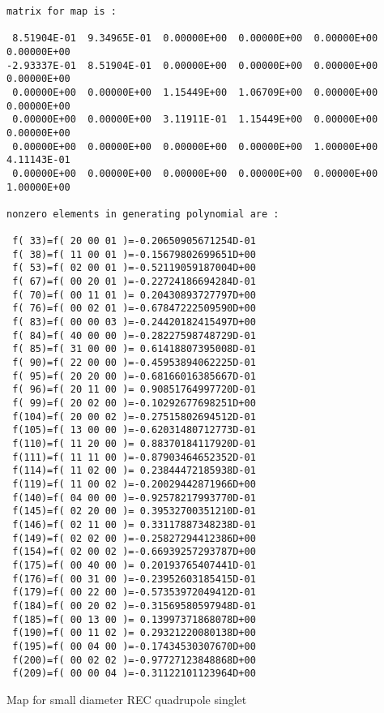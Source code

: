 \begin{footnotesize}
\begin{verbatim}
matrix for map is :

 8.51904E-01  9.34965E-01  0.00000E+00  0.00000E+00  0.00000E+00  0.00000E+00
-2.93337E-01  8.51904E-01  0.00000E+00  0.00000E+00  0.00000E+00  0.00000E+00
 0.00000E+00  0.00000E+00  1.15449E+00  1.06709E+00  0.00000E+00  0.00000E+00
 0.00000E+00  0.00000E+00  3.11911E-01  1.15449E+00  0.00000E+00  0.00000E+00
 0.00000E+00  0.00000E+00  0.00000E+00  0.00000E+00  1.00000E+00  4.11143E-01
 0.00000E+00  0.00000E+00  0.00000E+00  0.00000E+00  0.00000E+00  1.00000E+00

nonzero elements in generating polynomial are :

 f( 33)=f( 20 00 01 )=-0.20650905671254D-01
 f( 38)=f( 11 00 01 )=-0.15679802699651D+00
 f( 53)=f( 02 00 01 )=-0.52119059187004D+00
 f( 67)=f( 00 20 01 )=-0.22724186694284D-01
 f( 70)=f( 00 11 01 )= 0.20430893727797D+00
 f( 76)=f( 00 02 01 )=-0.67847222509590D+00
 f( 83)=f( 00 00 03 )=-0.24420182415497D+00
 f( 84)=f( 40 00 00 )=-0.28227598748729D-01
 f( 85)=f( 31 00 00 )= 0.61418807395008D-01
 f( 90)=f( 22 00 00 )=-0.45953894062225D-01
 f( 95)=f( 20 20 00 )=-0.68166016385667D-01
 f( 96)=f( 20 11 00 )= 0.90851764997720D-01
 f( 99)=f( 20 02 00 )=-0.10292677698251D+00
 f(104)=f( 20 00 02 )=-0.27515802694512D-01
 f(105)=f( 13 00 00 )=-0.62031480712773D-01
 f(110)=f( 11 20 00 )= 0.88370184117920D-01
 f(111)=f( 11 11 00 )=-0.87903464652352D-01
 f(114)=f( 11 02 00 )= 0.23844472185938D-01
 f(119)=f( 11 00 02 )=-0.20029442871966D+00
 f(140)=f( 04 00 00 )=-0.92578217993770D-01
 f(145)=f( 02 20 00 )= 0.39532700351210D-01
 f(146)=f( 02 11 00 )= 0.33117887348238D-01
 f(149)=f( 02 02 00 )=-0.25827294412386D+00
 f(154)=f( 02 00 02 )=-0.66939257293787D+00
 f(175)=f( 00 40 00 )= 0.20193765407441D-01
 f(176)=f( 00 31 00 )=-0.23952603185415D-01
 f(179)=f( 00 22 00 )=-0.57353972049412D-01
 f(184)=f( 00 20 02 )=-0.31569580597948D-01
 f(185)=f( 00 13 00 )= 0.13997371868078D+00
 f(190)=f( 00 11 02 )= 0.29321220080138D+00
 f(195)=f( 00 04 00 )=-0.17434530307670D+00
 f(200)=f( 00 02 02 )=-0.97727123848868D+00
 f(209)=f( 00 00 04 )=-0.31122101123964D+00
\end{verbatim}
\end{footnotesize}
Map for small diameter REC quadrupole singlet
